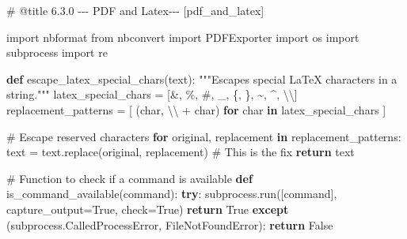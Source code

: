 \documentclass[
  11pt,
  letterpaper,
]{book}
\newenvironment{Shaded}{\begin{snugshade}}{\end{snugshade}}
\newcommand{\CharTok}[1]{\textcolor[rgb]{0.13,0.47,0.30}{#1}}
\newcommand{\CommentTok}[1]{\textcolor[rgb]{0.37,0.37,0.37}{#1}}
\newcommand{\ControlFlowTok}[1]{\textcolor[rgb]{0.00,0.23,0.31}{\textbf{#1}}}
\newcommand{\ImportTok}[1]{\textcolor[rgb]{0.00,0.46,0.62}{#1}}
\newcommand{\KeywordTok}[1]{\textcolor[rgb]{0.00,0.23,0.31}{\textbf{#1}}}
\newcommand{\NormalTok}[1]{\textcolor[rgb]{0.00,0.23,0.31}{#1}}
\newcommand{\OperatorTok}[1]{\textcolor[rgb]{0.37,0.37,0.37}{#1}}
\newcommand{\PreprocessorTok}[1]{\textcolor[rgb]{0.68,0.00,0.00}{#1}}
\newcommand{\StringTok}[1]{\textcolor[rgb]{0.13,0.47,0.30}{#1}}
\newcommand{\VariableTok}[1]{\textcolor[rgb]{0.07,0.07,0.07}{#1}}
\begin{document}
\label{pdf_and_latex}
\begin{Shaded}
\begin{Highlighting}[]
\CommentTok{\# @title 6.3.0 {-}{-}{-} PDF and Latex{-}{-}{-} [pdf\_and\_latex]}

\ImportTok{import}\NormalTok{ nbformat}
\ImportTok{from}\NormalTok{ nbconvert }\ImportTok{import}\NormalTok{ PDFExporter}
\ImportTok{import}\NormalTok{ os}
\ImportTok{import}\NormalTok{ subprocess}
\ImportTok{import}\NormalTok{ re}

\KeywordTok{def}\NormalTok{ escape\_latex\_special\_chars(text):}
  \CommentTok{"""Escapes special LaTeX characters in a string."""}
\NormalTok{  latex\_special\_chars }\OperatorTok{=}\NormalTok{ [}\StringTok{\textquotesingle{}\&\textquotesingle{}}\NormalTok{, }\StringTok{\textquotesingle{}\%\textquotesingle{}}\NormalTok{, }\StringTok{\textquotesingle{}\#\textquotesingle{}}\NormalTok{, }\StringTok{\textquotesingle{}\_\textquotesingle{}}\NormalTok{, }\StringTok{\textquotesingle{}\{\textquotesingle{}}\NormalTok{, }\StringTok{\textquotesingle{}\}\textquotesingle{}}\NormalTok{, }\StringTok{\textquotesingle{}\textasciitilde{}\textquotesingle{}}\NormalTok{, }\StringTok{\textquotesingle{}\^{}\textquotesingle{}}\NormalTok{, }\StringTok{\textquotesingle{}}\CharTok{\textbackslash{}\textbackslash{}}\StringTok{\textquotesingle{}}\NormalTok{]}
\NormalTok{  replacement\_patterns }\OperatorTok{=}\NormalTok{ [}
\NormalTok{      (char, }\StringTok{\textquotesingle{}}\CharTok{\textbackslash{}\textbackslash{}}\StringTok{\textquotesingle{}} \OperatorTok{+}\NormalTok{ char) }\ControlFlowTok{for}\NormalTok{ char }\KeywordTok{in}\NormalTok{ latex\_special\_chars}
\NormalTok{  ]}

  \CommentTok{\# Escape reserved characters}
  \ControlFlowTok{for}\NormalTok{ original, replacement }\KeywordTok{in}\NormalTok{ replacement\_patterns:}
\NormalTok{    text }\OperatorTok{=}\NormalTok{ text.replace(original, replacement) }\CommentTok{\# This is the fix}
  \ControlFlowTok{return}\NormalTok{ text}

\CommentTok{\# Function to check if a command is available}
\KeywordTok{def}\NormalTok{ is\_command\_available(command):}
    \ControlFlowTok{try}\NormalTok{:}
\NormalTok{        subprocess.run([command], capture\_output}\OperatorTok{=}\VariableTok{True}\NormalTok{, check}\OperatorTok{=}\VariableTok{True}\NormalTok{)}
        \ControlFlowTok{return} \VariableTok{True}
    \ControlFlowTok{except}\NormalTok{ (subprocess.CalledProcessError, }\PreprocessorTok{FileNotFoundError}\NormalTok{):}
        \ControlFlowTok{return} \VariableTok{False}


\end{Highlighting}
\end{Shaded}
\end{document}
